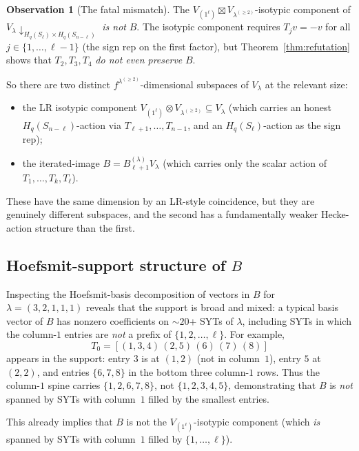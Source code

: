 \documentclass[11pt]{article}
\theoremstyle{definition}
\newtheorem{observation}[theorem]{Observation}
\begin{document}
\begin{observation}[The fatal mismatch]\label{obs:mismatch}
The $V_{(1^\ell)} \boxtimes V_{\lambda^{(\ge 2)}}$-isotypic component
of $V_\lambda \!\downarrow_{H_q(S_\ell) \times H_q(S_{n-\ell})}$
\emph{is not} $B$. The isotypic component requires $T_j v = -v$ for
all $j \in \{1, \ldots, \ell - 1\}$ (the sign rep on the first
factor), but Theorem~\ref{thm:refutation} shows that $T_2, T_3, T_4$
\emph{do not even preserve} $B$.
\end{observation}

So there are two distinct $f^{\lambda^{(\ge 2)}}$-dimensional subspaces
of $V_\lambda$ at the relevant size:
\begin{itemize}[leftmargin=2em,topsep=0.2em,itemsep=0.1em]
\item the LR isotypic component $V_{(1^\ell)} \otimes V_{\lambda^{(\ge 2)}}
\subseteq V_\lambda$ (which carries an honest $H_q(S_{n-\ell})$-action via
$T_{\ell+1}, \ldots, T_{n-1}$, and an $H_q(S_\ell)$-action as the sign rep);
\item the iterated-image $B = B_{\ell+1}^{(\lambda)} V_\lambda$ (which
carries only the scalar action of $T_1, \ldots, T_k, T_\ell$).
\end{itemize}
These have the same dimension by an LR-style coincidence, but they
are genuinely different subspaces, and the second has a
fundamentally weaker Hecke-action structure than the first.

\subsection{Hoefsmit-support structure of $B$}

Inspecting the Hoefsmit-basis decomposition of vectors in $B$ for
$\lambda = (3, 2, 1, 1, 1)$ reveals that the support is broad and
mixed: a typical basis vector of $B$ has nonzero coefficients on $\sim
20$+ SYTs of $\lambda$, including SYTs in which the column-$1$ entries
are \emph{not} a prefix of $\{1, 2, \ldots, \ell\}$. For example,
\[
   T_0 = [(1,3,4)\,(2,5)\,(6)\,(7)\,(8)]
\]
appears in the support: entry $3$ is at $(1, 2)$ (not in column~$1$),
entry $5$ at $(2, 2)$, and entries $\{6, 7, 8\}$ in the bottom three
column-$1$ rows. Thus the column-$1$ spine carries $\{1, 2, 6, 7, 8\}$,
not $\{1, 2, 3, 4, 5\}$, demonstrating that $B$ is \emph{not}
spanned by SYTs with column~$1$ filled by the smallest entries.

This already implies that $B$ is not the $V_{(1^\ell)}$-isotypic
component (which \emph{is} spanned by SYTs with column~$1$ filled by
$\{1, \ldots, \ell\}$).
\end{document}
